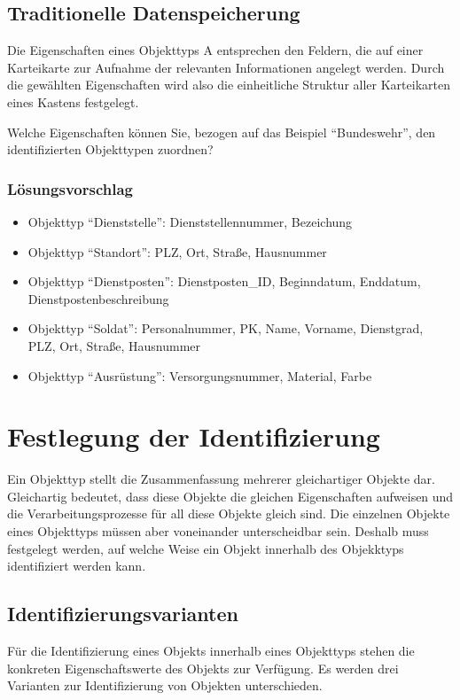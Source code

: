 \subsection{Traditionelle Datenspeicherung}
Die Eigenschaften eines Objekttyps A entsprechen den Feldern, die auf
einer Karteikarte zur Aufnahme der relevanten Informationen angelegt
werden. Durch die gewählten Eigenschaften wird also die einheitliche
Struktur aller Karteikarten eines Kastens festgelegt.

Welche Eigenschaften können Sie, bezogen auf das Beispiel
\enquote{Bundeswehr}, den identifizierten Objekttypen zuordnen?
\clearpage
\subsubsection{Lösungsvorschlag}
\begin{itemize}
    \item Objekttyp \enquote{Dienststelle}: Dienststellennummer,
          Bezeichung
    \item Objekttyp \enquote{Standort}: PLZ, Ort, Straße, Hausnummer
    \item Objekttyp \enquote{Dienstposten}: Dienstposten\_ID,
          Beginndatum, Enddatum, Dienstpostenbeschreibung
    \item Objekttyp \enquote{Soldat}: Personalnummer, PK, Name, Vorname,
          Dienstgrad, PLZ, Ort, Straße, Hausnummer
    \item Objekttyp \enquote{Ausrüstung}: Versorgungsnummer, Material,
          Farbe
\end{itemize}
\section{Festlegung der Identifizierung}
Ein Objekttyp stellt die Zusammenfassung mehrerer gleichartiger Objekte
dar. Gleichartig bedeutet, dass diese Objekte die gleichen Eigenschaften
aufweisen und die Verarbeitungsprozesse für all diese Objekte gleich
sind. Die einzelnen Objekte eines Objekttyps müssen aber voneinander
unterscheidbar sein. Deshalb muss festgelegt werden, auf welche Weise ein
Objekt innerhalb des Objekktyps identifiziert werden kann.

\subsection{Identifizierungsvarianten}
Für die Identifizierung eines Objekts innerhalb eines Objekttyps
stehen die konkreten Eigenschaftswerte des Objekts zur Verfügung. Es werden drei Varianten zur Identifizierung von Objekten
unterschieden.
